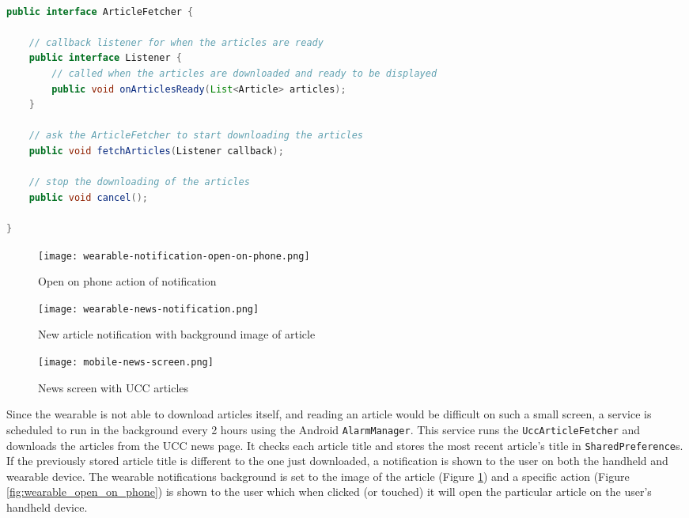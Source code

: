 \begin{lstlisting}[language=Java]

public interface ArticleFetcher {

    // callback listener for when the articles are ready
    public interface Listener {
        // called when the articles are downloaded and ready to be displayed
        public void onArticlesReady(List<Article> articles);
    }

    // ask the ArticleFetcher to start downloading the articles
    public void fetchArticles(Listener callback);

    // stop the downloading of the articles
    public void cancel();

}

\end{lstlisting}

\begin{figure}
    \centering
    \texttt{[image: wearable-notification-open-on-phone.png]}
    \caption{Open on phone action of notification}
    \label{fig:wearable_open_on_phone}
    \texttt{[image: wearable-news-notification.png]}
    \caption{New article notification with background image of article}
    \label{fig:wearable_news_notification}
\end{figure}

\begin{figure}
    \centering
    \texttt{[image: mobile-news-screen.png]}
    \caption{News screen with UCC articles}
    \label{fig:handheld_news_screen}
\end{figure}

Since the wearable is not able to download articles itself, and reading an
article would be difficult on such a small screen, a service is scheduled to
run in the background every 2 hours using the Android \texttt{AlarmManager}.
This service runs the \texttt{UccArticleFetcher} and downloads the articles
from the UCC news page. It checks each article title and stores the most recent
article's title in \texttt{SharedPreference}s. If the previously stored article
title is different to the one just downloaded, a notification is shown to the
user on both the handheld and wearable device. The wearable notifications
background is set to the image of the article
(Figure \ref{fig:wearable_news_notification}) and a specific action
(Figure \ref{fig:wearable_open_on_phone}) is shown
to the user which when clicked (or touched) it will open the particular article
on the user's handheld device.


